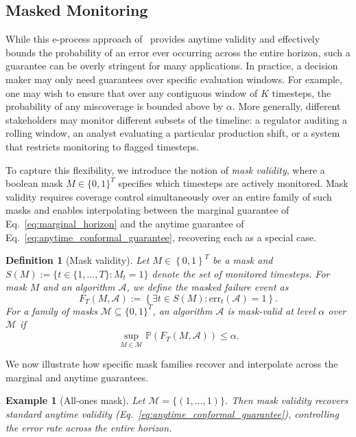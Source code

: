 \documentclass{uai2026} %
\newtheorem{definition}[theorem]{Definition}
\newtheorem{example}[theorem]{Example}
\newcommand{\1}{\mathbf{1}}
\newcommand{\prob}{\mathbb{P}}
\newcommand{\ens}[1]{\left\{#1\right\}}
\newcommand{\err}{\mathrm{err}}
\newcommand{\mcal}{\mathcal{M}}
\newcommand{\acal}{\mathcal{A}}
\begin{document}
\subsection{Masked Monitoring}

While this e-process approach of~\citet{gauthier2025values} provides anytime validity and effectively bounds the probability of an error ever occurring across the entire horizon, such a guarantee can be overly stringent for many applications. In practice, a decision maker may only need guarantees over specific evaluation windows. For example, one may wish to ensure that over any contiguous window of $K$ timesteps, the probability of any miscoverage is bounded above by $\alpha$. More generally, different stakeholders may monitor different subsets of the timeline: a regulator auditing a rolling window, an analyst evaluating a particular production shift, or a system that restricts monitoring to flagged timesteps.

To capture this flexibility, we introduce the notion of \emph{mask validity}, where a boolean mask $M \in \{0,1\}^T$ specifies which timesteps are actively monitored.  Mask validity requires coverage control simultaneously over an entire family of such masks and enables interpolating between the marginal guarantee of Eq.~\eqref{eq:marginal_horizon} and the anytime guarantee of Eq.~\eqref{eq:anytime_conformal_guarantee}, recovering each as a special case.


\begin{definition}[Mask validity]
  \label{def:mask-validity}
  Let $M\in \ens{0,1}^T$ be a mask and $S(M) := \{t \in \{1,\dots,T\} \colon M_t=1\}$ denote the set of monitored timesteps. For mask $M$ and an algorithm $\acal$, we define the masked failure event as
  \begin{equation}
    \label{eq:mask_valid_norestart}
    F_T(M, \acal):=\left\{\exists t\in S(M)\colon \err_t(\acal) = 1\right\}.
  \end{equation}
  For a family of masks $\mcal \subseteq\{0,1\}^T$, an algorithm $\acal$ is \emph{mask-valid at level $\alpha$ over $\mcal$} if
  \begin{equation*}
    \sup_{M\in\mcal}\prob(F_T(M, \acal))\le\alpha.
  \end{equation*}
\end{definition}

We now illustrate how specific mask families recover and interpolate across the marginal and anytime guarantees.

\begin{example}[All-ones mask]
  Let $\mcal = \{(1, \ldots, 1)\}$. Then mask validity recovers standard \emph{anytime} validity (Eq.~\ref{eq:anytime_conformal_guarantee}), controlling the error rate across the entire horizon.
\end{example}
\end{document}

